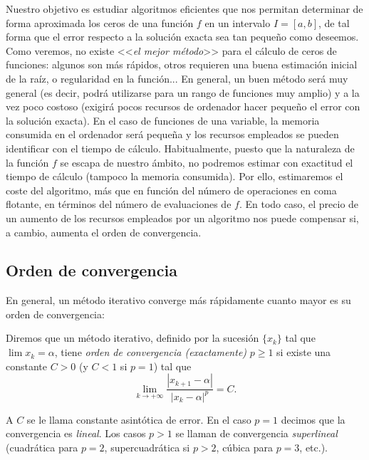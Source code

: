 Nuestro objetivo es estudiar algoritmos eficientes que nos permitan
determinar de forma aproximada los ceros de una función $f$ en un
intervalo $I=[a,b]$, de tal forma que el error respecto a la solución
exacta sea tan pequeño como deseemos. Como veremos, no existe
<<\textit{el mejor método}>> para el cálculo de ceros de funciones:
algunos son más rápidos, otros requieren una buena estimación inicial
de la raíz, o regularidad en la función... En general, un buen método
será muy general (es decir, podrá utilizarse para un rango de
funciones muy amplio) y a la vez poco costoso (exigirá pocos recursos
de ordenador hacer pequeño el error con la solución exacta). En el
caso de funciones de una variable, la memoria consumida en el
ordenador será pequeña y los recursos empleados se pueden identificar
con el tiempo de cálculo. Habitualmente, puesto que la naturaleza de
la función $f$ se escapa de nuestro ámbito, no podremos estimar con
exactitud el tiempo de cálculo (tampoco la memoria consumida). Por
ello, estimaremos el coste del algoritmo, más que en función del
número de operaciones en coma flotante, en términos del número de
evaluaciones de $f$. En todo caso, el precio de un aumento de los
recursos empleados por un algoritmo nos puede compensar si, a cambio,
aumenta el orden de convergencia.

\subsection*{Orden de convergencia}

En general, un método iterativo converge más rápidamente cuanto mayor
es su orden de convergencia:

\begin{definition}
  \label{def:orden-convergencia}  
  Diremos que un método iterativo, definido por la sucesión $\{x_k\}$
  tal que $\lim x_k=\alpha$, tiene \textit{orden de convergencia
    (exactamente)} $p\ge 1$ si existe una constante $C>0$ (y $C<1$ si
  $p=1$) tal que
  \begin{equation}
    \label{eq:orden-convergencia}
    \lim_{k\to+\infty} \frac{|x_{k+1}-\alpha|}{|x_k-\alpha|^p} = C.
  \end{equation}
\end{definition}
A $C$ se le llama constante asintótica de error. En el caso $p=1$ 
decimos que la convergencia es \textit{lineal}. Los casos $p>1$ se
llaman de convergencia \textit{superlineal} (cuadrática para $p=2$,
supercuadrática si $p>2$, cúbica para $p=3$, etc.).

